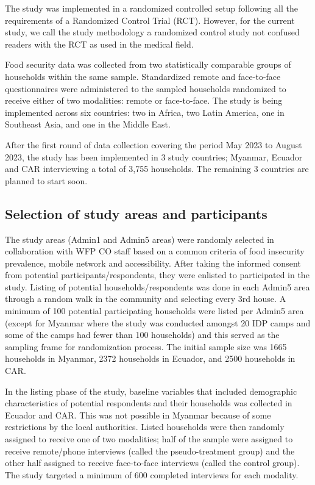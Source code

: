 \documentclass[11pt,harvard]{article}
\begin{document}
The study was implemented in a randomized controlled setup following all the requirements of a Randomized Control Trial (RCT). However, for the current study, we call the study methodology a randomized control study not confused readers with the RCT as used in the medical field. 

Food security data was collected from two statistically comparable groups of households within the same sample. Standardized remote and face-to-face questionnaires were administered to the sampled households randomized to receive either of two modalities: remote or face-to-face. The study is being implemented across six countries: two in Africa, two Latin America, one in Southeast Asia, and one in the Middle East.

After the first round of data collection covering the period May 2023 to August 2023, the study has been implemented in 3 study countries; Myanmar, Ecuador and CAR interviewing a total of 3,755 households. The remaining 3 countries are planned to start soon.

	\subsection{Selection of study areas and participants}

The study areas (Admin1 and Admin5 areas) were randomly selected in collaboration with WFP CO staff based on a common criteria of food insecurity prevalence, mobile network and accessibility.
After taking the informed consent from potential participants/respondents, they were enlisted to participated in the study. Listing of potential households/respondents was done in each Admin5 area through a random walk in the community and selecting every 3rd house. A minimum of 100 potential participating households were listed per Admin5 area (except for Myanmar where the study was conducted amongst 20 IDP camps and some of the camps had fewer than 100 households) and this served as the sampling frame for randomization process. The initial sample size was 1665 households in Myanmar, 2372 households in Ecuador, and 2500 households in CAR. 

In the listing phase of the study, baseline variables that included demographic characteristics of potential respondents and their households was collected in Ecuador and CAR. This was not possible in Myanmar because of some restrictions by the local authorities. Listed households were then randomly assigned to receive one of two modalities; half of the sample were assigned to receive remote/phone interviews (called the pseudo-treatment group) and the other half assigned to receive face-to-face interviews (called the control group). The study targeted a minimum of 600 completed interviews for each modality.
\end{document}
